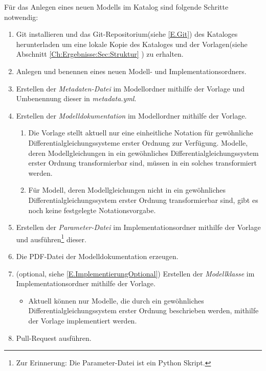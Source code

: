 Für das Anlegen eines neuen Modells im Katalog sind folgende Schritte notwendig:
\begin{enumerate}
	\item Git installieren und das Git-Repositorium(siehe \ref{E.Git}) des Kataloges herunterladen um eine lokale Kopie des Kataloges und der Vorlagen(siehe Abschnitt \ref{Ch:Ergebnisse:Sec:Struktur} ) zu erhalten.
	\item Anlegen und benennen eines neuen Modell- und Implementationsordners.
	\item Erstellen der \textit{Metadaten-Datei} im Modellordner mithilfe der Vorlage und Umbenennung dieser in \textit{metadata.yml}.
	\item Erstellen der \textit{Modelldokumentation} im Modellordner mithilfe der Vorlage.
	\begin{enumerate}[label=\textbf{Anmerkung \arabic*}:, wide=0pt, leftmargin=*]
		\item Die Vorlage stellt aktuell nur eine einheitliche Notation für gewöhnliche Differentialgleichungssysteme erster Ordnung zur Verfügung. Modelle, deren Modellgleichungen in ein gewöhnliches Differentialgleichungssystem erster Ordnung transformierbar sind, müssen in ein solches transformiert werden.
		\item Für Modell, deren Modellgleichungen nicht in ein gewöhnliches Differentialgleichungssystem erster Ordnung transformierbar sind, gibt es noch keine festgelegte Notationsvorgabe.
	\end{enumerate}
	\item Erstellen der \textit{Parameter-Datei} im Implementationsordner mithilfe der Vorlage und ausführen\footnote{Zur Erinnerung: Die Parameter-Datei ist ein Python Skript.} dieser.
	\item Die PDF-Datei der Modelldokumentation erzeugen.
	\item (optional, siehe \ref{E.ImplementierungOptional}) Erstellen der \textit{Modellklasse} im Implementationsordner mithilfe der Vorlage.
	\begin{itemize}[label=\textbf{Anmerkung}:, wide=0pt, leftmargin=*]
		\item Aktuell können nur Modelle, die durch ein gewöhnliches Differentialgleichungssystem erster Ordnung beschrieben werden, mithilfe der Vorlage implementiert werden.
	\end{itemize}
	\item Pull-Request ausführen.
\end{enumerate}





